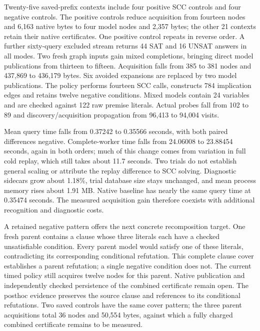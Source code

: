 \documentclass[11pt,a4paper]{article}
\numberwithin{equation}{section}
\theoremstyle{plain}
\theoremstyle{definition}
\theoremstyle{remark}
\begin{document}
Twenty-five saved-prefix contexts include four positive SCC controls and four
negative controls. The positive controls reduce acquisition from fourteen
nodes and 6,163 native bytes to four model nodes and 2,357 bytes; the other
21 contexts retain their native certificates. One positive control repeats in
reverse order. A further sixty-query excluded stream returns 44 SAT and
16 UNSAT answers in all modes. Two fresh graph inputs gain mixed completions,
bringing direct model publications from thirteen to fifteen. Acquisition falls
from 385 to 381 nodes and 437,869 to 436,179 bytes. Six avoided expansions are
replaced by two model publications. The policy performs fourteen SCC calls,
constructs 784 implication edges and retains twelve negative conditions.
Mixed models contain 24 variables and are checked against 122 raw premise
literals. Actual probes fall from 102 to 89 and discovery/acquisition
propagation from 96,413 to 94,004 visits.

Mean query time falls from 0.37242 to 0.35566 seconds, with both paired
differences negative. Complete-worker time falls from 24.06008 to 23.88454
seconds, again in both orders; much of this change comes from variation in
full cold replay, which still takes about 11.7 seconds. Two trials do not
establish general scaling or attribute the replay difference to SCC solving.
Diagnostic sidecars grow about 1.18\%, trial database size stays unchanged,
and mean process memory rises about 1.91 MB. Native baseline has nearly the
same query time at 0.35474 seconds. The measured acquisition gain therefore
coexists with additional recognition and diagnostic costs.

A retained negative pattern offers the next concrete recomposition target.
One fresh parent contains a clause whose three literals each have a checked
unsatisfiable condition. Every parent model would satisfy one of these
literals, contradicting its corresponding conditional refutation. This complete
clause cover establishes a parent refutation; a single negative condition does
not. The current timed policy still acquires twelve nodes for this parent.
Native publication and independently checked persistence of the combined
certificate remain open. The posthoc evidence preserves the source clause and
references to its conditional refutations. Two saved controls have the same
cover pattern; the three parent acquisitions total 36 nodes and 50,554 bytes,
against which a fully charged combined certificate remains to be measured.
\end{document}
